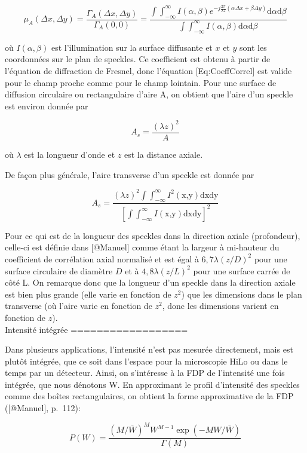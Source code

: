 \documentclass[]{article}
\begin{document}
\[
\label{Eq:CoeffCorrel}
​    \mu_{A}(\Delta x, \Delta y) = \frac{\Gamma_{A}(\Delta x, \Delta y)}{\Gamma_{A}(0,0)} = \frac{\int\int_{-\infty}^{\infty}I(\alpha, \beta)e^{-j\frac{2\pi}{\lambda z}(\alpha \Delta x + \beta \Delta y)}\text{d}\alpha\text{d}\beta}{\int\int_{-\infty}^{\infty}I(\alpha, \beta)\text{d}\alpha\text{d}\beta}
\]

où \(I(\alpha, \beta)\) est l'illumination sur la surface diffusante et
\(x\) et \(y\) sont les coordonnées sur le plan de speckles. Ce
coefficient est obtenu à partir de l'équation de diffraction de Fresnel,
donc l'équation {[}Eq:CoeffCorrel{]} est valide pour le champ proche
comme pour le champ lointain. Pour une surface de diffusion circulaire
ou rectangulaire d'aire A, on obtient que l'aire d'un speckle est
environ donnée par

\[
A_{s} = \frac{(\lambda z)^2}{A}
\]

où \(\lambda\) est la longueur d'onde et \(z\) est la distance axiale.

De façon plus générale, l'aire transverse d'un speckle est donnée par

\[
A_{s} = \frac{(\lambda z)^{2}\int\int_{-\infty}^{\infty}I^{2}(\text{x,y})\text{dxdy}}{\left[\int\int_{-\infty}^{\infty}I(\text{x,y})\text{dxdy}\right]^2}
\]

Pour ce qui est de la longueur des speckles dans la direction axiale
(profondeur), celle-ci est définie dans {[}@Manuel{]} comme étant la
largeur à mi-hauteur du coefficient de corrélation axial normalisé et
est égal à \(6,7\lambda(z/D)^2\) pour une surface circulaire de diamètre
\(D\) et à \(4,8\lambda(z/L)^2\) pour une surface carrée de côté L. On
remarque donc que la longueur d'un speckle dans la direction axiale est
bien plus grande (elle varie en fonction de \(z^2\)) que les dimensions
dans le plan transverse (où l'aire varie en fonction de \(z^2\), donc
les dimensions varient en fonction de \(z\)).\\
Intensité intégrée ==================

Dans plusieurs applications, l'intensité n'est pas mesurée directement,
mais est plutôt intégrée, que ce soit dans l'espace pour la microscopie
HiLo ou dans le temps par un détecteur. Ainsi, on s'intéresse à la FDP
de l'intensité une fois intégrée, que nous dénotons W. En approximant le
profil d'intensité des speckles comme des boîtes rectangulaires, on
obtient la forme approximative de la FDP ({[}@Manuel{]}, p.~112):

\[
\label{Eq:IntIntUn}
​    P(W) = \frac{(M/\overline{W})^{M}W^{M-1}\exp(-MW/\overline{W})}{\Gamma(M)}
\]
\end{document}
